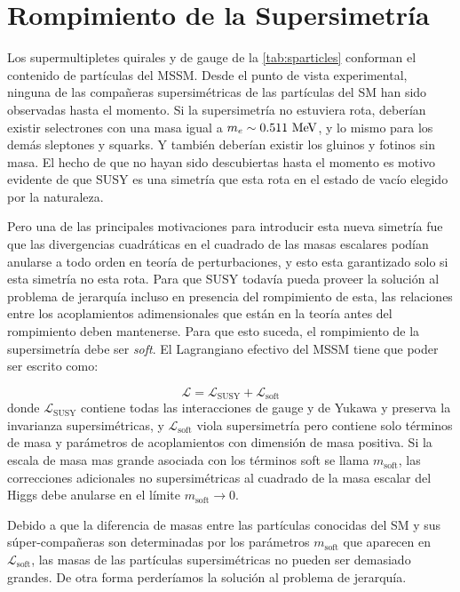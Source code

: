 \section{Rompimiento de la Supersimetría}

Los supermultipletes quirales y de gauge de la \cref{tab:sparticles} conforman
el contenido de partículas del MSSM. Desde el punto de vista experimental,
ninguna de las compa\~neras supersimétricas de las partículas del SM han sido
observadas hasta el momento. Si la supersimetría no estuviera rota, deberían
existir selectrones con una masa igual a $m_e \sim 0.511 \mev$, y lo mismo para
los demás sleptones y squarks. Y también deberían existir los gluinos y fotinos
sin masa. El hecho de que no hayan sido descubiertas hasta el momento es motivo
evidente de que SUSY es una simetría que esta rota en el estado de vacío elegido
por la naturaleza.

Pero una de las principales motivaciones para introducir esta nueva simetría fue
que las divergencias cuadráticas en el cuadrado de las masas escalares podían
anularse a todo orden en teoría de perturbaciones, y esto esta garantizado solo
si esta simetría no esta rota. Para que SUSY todavía pueda proveer la solución
al problema de jerarquía incluso en presencia del rompimiento de esta, las
relaciones entre los acoplamientos adimensionales que están en la teoría antes
del rompimiento deben mantenerse. Para que esto suceda, el rompimiento de la
supersimetría debe ser \emph{soft}. El Lagrangiano efectivo del MSSM tiene que
poder ser escrito como:

\begin{equation}
  \mathcal{L} = \mathcal{L}_\text{SUSY} + \mathcal{L}_\text{soft}
\end{equation}
%
donde $\mathcal{L}_\text{SUSY}$ contiene todas las interacciones de gauge y de
Yukawa y preserva la invarianza supersimétricas, y $\mathcal{L}_\text{soft}$
viola supersimetría pero contiene solo términos de masa y parámetros de
acoplamientos con dimensión de masa positiva. Si la escala de masa mas grande
asociada con los términos soft se llama $m_\text{soft}$, las correcciones
adicionales no supersimétricas al cuadrado de la masa escalar del Higgs debe
anularse en el límite $m_\text{soft} \to 0$.

Debido a que la diferencia de masas entre las partículas conocidas del SM y sus
súper-compañeras son determinadas por los parámetros $m_\text{soft}$ que
aparecen en $\mathcal{L}_\text{soft}$, las masas de las partículas
supersimétricas no pueden ser demasiado grandes. De otra forma perderíamos la
solución al problema de jerarquía.

